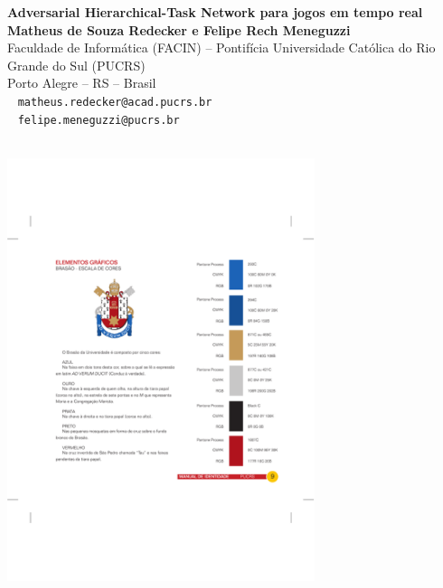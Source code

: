 \documentclass[a0,portrait]{a0poster}
\begin{document}
\begin{minipage}[b]{0.75\linewidth}
\veryHuge \color{NavyBlue} 
\textbf{Adversarial Hierarchical-Task Network para jogos em tempo real} 
\color{Black}\\[2cm] %
\huge \textbf{Matheus de Souza Redecker e Felipe Rech Meneguzzi}\\
\Large Faculdade de Inform\'atica (FACIN) -- 
Pontif\'icia Universidade Cat\'olica do Rio Grande do Sul (PUCRS)\\ 
Porto Alegre -- RS -- Brasil\\ %
\Large \Letter ~ \texttt{matheus.redecker@acad.pucrs.br}\\
\Large \Letter ~ \texttt{felipe.meneguzzi@pucrs.br}\\
\\
\end{minipage}
\hspace*{-2cm}
\begin{minipage}[t]{0.25\linewidth}
\begin{center}
\vspace{-15cm}\includegraphics[width=9cm]{fig/logoPUCRS.pdf}%
\hspace*{1cm}
\end{center}
\end{minipage}
\end{document}

